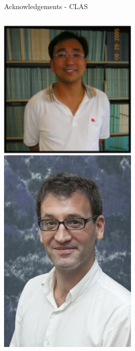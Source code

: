 \documentclass[aspectratio=169]{beamer}
\begin{document}
\begin{frame}{Acknowledgements - CLAS}
\begin{columns}
            \includegraphics[width=0.5\textwidth]{people/jlab_clas/joo.png}
            \includegraphics[width=0.5\textwidth]{people/jlab_clas/fx.png}
            
        \end{columns}      
    
\end{frame}
\end{document}
